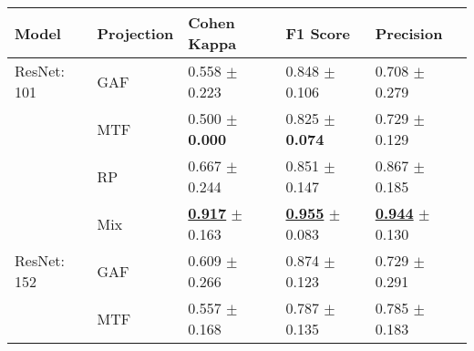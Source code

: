 
\begin{tabular}[t]{lllll}
\toprule
Model & Projection & Cohen Kappa & F1 Score & Precision \\
\midrule
ResNet: 101 & GAF & \textcolor[rgb]{0.8016949153,0.1983050847,0}{0.558} $\pm$ \textcolor[rgb]{0.8390827308,0.1609172692,0}{0.223} & \textcolor[rgb]{0.5824436536,0.4175563464,0}{0.848} $\pm$ \textcolor[rgb]{0.3085501457,0.5000000000,0}{0.106} & \textcolor[rgb]{0.8947368421,0.1052631579,0}{0.708} $\pm$ \textcolor[rgb]{0.9153570597,0.0846429403,0}{0.279} \\
 & MTF & \textcolor[rgb]{0.9322033898,0.0677966102,0}{0.500} $\pm$ \textbf{\textcolor[rgb]{0.0000000000,0.5000000000,0}{0.000}} & \textcolor[rgb]{0.7089758798,0.2910241202,0}{0.825} $\pm$ \textbf{\textcolor[rgb]{0.0000000000,0.5000000000,0}{0.074}} & \textcolor[rgb]{0.8157894737,0.1842105263,0}{0.729} $\pm$ \textcolor[rgb]{0.0086983842,0.5000000000,0}{0.129} \\
 & RP & \textcolor[rgb]{0.5593220339,0.4406779661,0}{0.667} $\pm$ \textcolor[rgb]{0.9177344209,0.0822655791,0}{0.244} & \textcolor[rgb]{0.5663107948,0.4336892052,0}{0.851} $\pm$ \textcolor[rgb]{0.6997338079,0.3002661921,0}{0.147} & \textcolor[rgb]{0.2947368421,0.5000000000,0}{0.867} $\pm$ \textcolor[rgb]{0.3495262089,0.5000000000,0}{0.185} \\
 & Mix & \underline{\textbf{\textcolor[rgb]{0.0000000000,0.5000000000,0}{0.917}}} $\pm$ \textcolor[rgb]{0.6114994881,0.3885005119,0}{0.163} & \underline{\textbf{\textcolor[rgb]{0.0000000000,0.5000000000,0}{0.955}}} $\pm$ \textcolor[rgb]{0.0859174230,0.5000000000,0}{0.083} & \underline{\textbf{\textcolor[rgb]{0.0000000000,0.5000000000,0}{0.944}}} $\pm$ \textcolor[rgb]{0.0148524795,0.5000000000,0}{0.130} \\
ResNet: 152 & GAF & \textcolor[rgb]{0.6881355932,0.3118644068,0}{0.609} $\pm$ \textcolor[rgb]{1.0000000000,0.0000000000,0}{0.266} & \textcolor[rgb]{0.4400948992,0.5000000000,0}{0.874} $\pm$ \textcolor[rgb]{0.4703014094,0.5000000000,0}{0.123} & \textcolor[rgb]{0.8157894737,0.1842105263,0}{0.729} $\pm$ \textcolor[rgb]{0.9907354857,0.0092645143,0}{0.291} \\
 & MTF & \textcolor[rgb]{0.8048022599,0.1951977401,0}{0.557} $\pm$ \textcolor[rgb]{0.6318123512,0.3681876488,0}{0.168} & \textcolor[rgb]{0.9199288256,0.0800711744,0}{0.787} $\pm$ \textcolor[rgb]{0.5890134114,0.4109865886,0}{0.135} & \textcolor[rgb]{0.6052631579,0.3947368421,0}{0.785} $\pm$ \textcolor[rgb]{0.3355159200,0.5000000000,0}{0.183} \\

\end{tabular}
